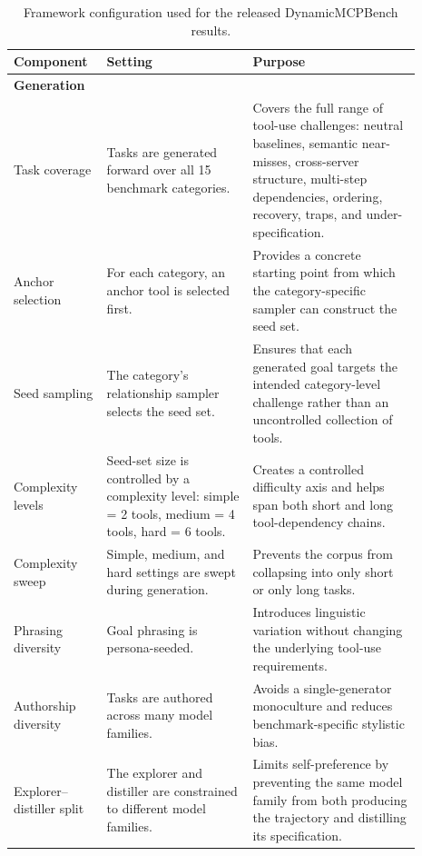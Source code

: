 \begin{table}[t]
\centering
\small
\caption{Framework configuration used for the released DynamicMCPBench results.}
\label{tab:framework-config}
\begin{tabular}{p{0.18\linewidth}p{0.33\linewidth}p{0.38\linewidth}}
\toprule
\textbf{Component} & \textbf{Setting} & \textbf{Purpose} \\
\midrule

\multicolumn{3}{l}{\textbf{Generation}} \\
\midrule

Task coverage &
Tasks are generated forward over all 15 benchmark categories. &
Covers the full range of tool-use challenges: neutral baselines, semantic
near-misses, cross-server structure, multi-step dependencies, ordering,
recovery, traps, and under-specification. \\

Anchor selection &
For each category, an anchor tool is selected first. &
Provides a concrete starting point from which the category-specific sampler can
construct the seed set. \\

Seed sampling &
The category's relationship sampler selects the seed set. &
Ensures that each generated goal targets the intended category-level challenge
rather than an uncontrolled collection of tools. \\

Complexity levels &
Seed-set size is controlled by a complexity level:
simple = 2 tools, medium = 4 tools, hard = 6 tools. &
Creates a controlled difficulty axis and helps span both short and long
tool-dependency chains. \\

Complexity sweep &
Simple, medium, and hard settings are swept during generation. &
Prevents the corpus from collapsing into only short or only long tasks. \\

Phrasing diversity &
Goal phrasing is persona-seeded. &
Introduces linguistic variation without changing the underlying tool-use
requirements. \\

Authorship diversity &
Tasks are authored across many model families. &
Avoids a single-generator monoculture and reduces benchmark-specific stylistic
bias. \\

Explorer--distiller split &
The explorer and distiller are constrained to different model families. &
Limits self-preference by preventing the same model family from both producing
the trajectory and distilling its specification. \\


\end{tabular}
\end{table}
